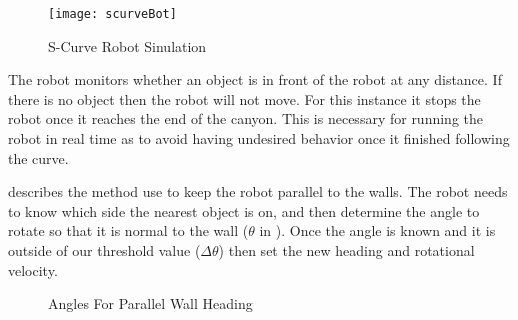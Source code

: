 \documentclass[main.tex]{subfiles}
\begin{document}
\begin{figure}[H]
\begin{center}
\texttt{[image: scurveBot]}
\end{center}
\caption{S-Curve Robot Sinulation}
\label{fig:scurveSim}
\end{figure}


The robot monitors whether an object is in front of the robot at any distance.
If there is no object then the robot will not move. For this instance it stops
the robot once it reaches the end of the canyon. This is necessary for running
the robot in real time as to avoid having undesired behavior once it finished
following the curve. 

 describes the method use to keep the robot parallel to the
walls. The robot needs to know which side the nearest object is on, and then
determine the angle to rotate so that it is normal to the wall ($\theta$ in
). Once the angle is known and it is outside of our threshold
value ($\Delta\theta$) then set the new heading and rotational velocity.

\begin{figure}[H]
\begin{center}

\end{center}
\caption{Angles For Parallel Wall Heading}
\label{fig:prWall}
\end{figure}
\end{document}
